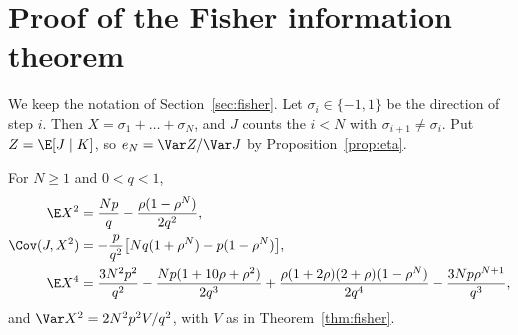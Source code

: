 \section{Proof of the Fisher information theorem}\label{app:fisher}

We keep the notation of Section~\ref{sec:fisher}. Let
$\sigma_i\in\{-1,1\}$ be the direction of step $i$. Then
$X=\sigma_1+\dots+\sigma_N$, and $J$ counts the $i<N$ with
$\sigma_{i+1}\ne\sigma_i$. Put $Z=\E[J\mid K]$, so $e_N=\Var Z/\Var J$
by Proposition~\ref{prop:eta}.

\begin{lemma}\label{lem:fisher-moments}
For $N\ge1$ and $0<q<1$,
\begin{align*}
 \E X^2&=\frac{Np}q-\frac{\rho(1-\rho^N)}{2q^2},\\
 \Cov(J,X^2)&=-\frac p{q^2}\bigl[Nq(1+\rho^N)-p(1-\rho^N)\bigr],\\
 \E X^4&=\frac{3N^2p^2}{q^2}-\frac{Np(1+10\rho+\rho^2)}{2q^3}
 +\frac{\rho(1+2\rho)(2+\rho)(1-\rho^N)}{2q^4}
 -\frac{3Np\rho^{N+1}}{q^3},
\end{align*}
and $\Var X^2=2N^2p^2V/q^2$, with $V$ as in Theorem~\ref{thm:fisher}.
\end{lemma}

